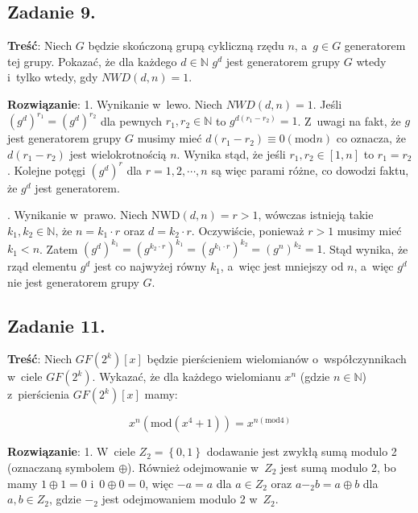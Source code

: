 \documentclass[a4paper,10pt, twocolumn]{article}
\begin{document}
\subsection{Zadanie 9.}

\textbf{Treść}: Niech $G$ będzie skończoną grupą cykliczną rzędu $n$, a~$g \in G$ generatorem tej grupy. Pokazać, że dla każdego $d \in \mathbb{N}$ $g^{d}$ jest generatorem grupy $G$ wtedy i~tylko wtedy, gdy $NWD(d,n) = 1$.

\textbf{Rozwiązanie}: 1. Wynikanie w~lewo. Niech $NWD(d,n) = 1$. Jeśli $(g^{d})^{r_{1}} = (g^{d})^{r_{2}}$ dla pewnych $r_{1}, r_{2} \in \mathbb{N}$ to $g^{d(r_{1} - r_{2})} = 1$. Z~uwagi na fakt, że $g$ jest generatorem grupy $G$ musimy mieć $d(r_{1} - r_{2}) \equiv 0 (\text{mod}n)$ co oznacza, że $d(r_{1} - r_{2})$ jest wielokrotnością $n$. Wynika stąd, że jeśli $r_{1}, r_{2} \in [1, n]$ to $r_{1} = r_{2}$. Kolejne potęgi $(g^{d})^{r}$ dla $r = 1, 2, \cdots, n$ są więc parami różne, co dowodzi faktu, że $g^{d}$ jest generatorem. 

. Wynikanie w~prawo. Niech $\text{NWD}(d,n) = r > 1$, wówczas istnieją takie $k_{1}, k_{2} \in \mathbb{N}$, że $n = k_{1} \cdot r$ oraz $d = k_{2} \cdot r$. Oczywiście, ponieważ $r > 1$ musimy mieć $k_{1} < n$. Zatem $(g^{d})^{k_{1}} = (g^{k_{2} \cdot r})^{k_{1}} = (g^{k_{1} \cdot r})^{k_{2}} = (g^{n})^{k_{2}} = 1$. Stąd wynika, że rząd elementu $g^{d}$ jest co najwyżej równy $k_{1}$, a~więc jest mniejszy od $n$, a~więc $g^{d}$ nie jest generatorem grupy $G$.

\subsection{Zadanie 11.}

\textbf{Treść}: Niech $GF(2^{k})[x]$ będzie pierścieniem wielomianów o~współczynnikach w~ciele $GF(2^{k})$. Wykazać, że dla każdego wielomianu $x^{n}$ (gdzie $n \in \mathbb{N}$) z~pierścienia $GF(2^{k})[x]$ mamy:

\begin{equation*}
	x^{n}(\text{mod}(x^{4} + 1)) = x^{n(\text{mod} 4)}
\end{equation*}

\textbf{Rozwiązanie}: 1. W~ciele $Z_{2} = \left\{0,1\right\}$ dodawanie jest zwykłą sumą modulo 2 (oznaczaną symbolem $\oplus$). Również odejmowanie w~$Z_{2}$ jest sumą modulo 2, bo mamy $1 \oplus 1 = 0$ i~$0 \oplus 0 = 0$, więc $-a = a$ dla $a \in Z_{2}$ oraz $a -_{2} b = a \oplus b$ dla $a, b \in Z_{2}$, gdzie $-_{2}$ jest odejmowaniem modulo 2 w~$Z_{2}$.
\end{document}
